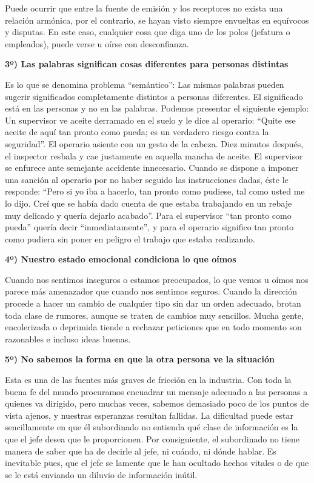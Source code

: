 Puede ocurrir que entre la fuente de emisión y los receptores no exista una relación armónica, por el contrario, se hayan visto siempre envueltas en equívocos y disputas. En este caso, cualquier cosa que diga uno de los polos (jefatura o empleados), puede verse u oírse con desconfianza.

\textbf{3º) Las palabras significan cosas diferentes para personas distintas}



Es lo que se denomina problema “semántico”: Las mismas palabras pueden sugerir significados completamente distintos a personas diferentes. El significado está en las personas y no en las palabras. Podemos presentar el siguiente ejemplo: Un supervisor ve aceite derramado en el suelo y le dice al operario: “Quite ese aceite de aquí tan pronto como pueda; es un verdadero riesgo contra la seguridad”. El operario asiente con un gesto de la cabeza. Diez minutos después, el inspector resbala y cae justamente en aquella mancha de aceite. El supervisor se enfurece ante semejante accidente innecesario. Cuando se dispone a imponer una sanción al operario por no haber seguido las instrucciones dadas, éste le responde: “Pero si yo iba a hacerlo, tan pronto como pudiese, tal como usted me lo dijo. Creí que se había dado cuenta de que estaba trabajando en un rebaje muy delicado y quería dejarlo acabado”. Para el supervisor “tan pronto como pueda” quería decir “inmediatamente”, y para el operario significo tan pronto como pudiera sin poner en peligro el trabajo que estaba realizando.

\textbf{4º) Nuestro estado emocional condiciona lo que oímos}

Cuando nos sentimos inseguros o estamos preocupados, lo que vemos u oímos nos parece más amenazador que cuando nos sentimos seguros. Cuando la dirección procede a hacer un cambio de cualquier tipo sin dar un orden adecuado, brotan toda clase de rumores, aunque se traten de cambios muy sencillos. Mucha gente, encolerizada o deprimida tiende a rechazar peticiones que en todo momento son razonables e incluso ideas buenas.

\textbf{5º) No sabemos la forma en que la otra persona ve la situación}

Esta es una de las fuentes más graves de fricción en la industria. Con toda la buena fe del mundo procuramos encuadrar un mensaje adecuado a las personas a quienes va dirigido, pero muchas veces, sabemos demasiado poco de los puntos de vista ajenos, y nuestras esperanzas resultan fallidas. La dificultad puede estar sencillamente en que él subordinado no entienda qué clase de información es la que el jefe desea que le proporcionen. Por consiguiente, el subordinado no tiene manera de saber que ha de decirle al jefe, ni cuándo, ni dónde hablar. Es inevitable pues, que el jefe se lamente que le han ocultado hechos vitales o de que se le está enviando un diluvio de información inútil.

